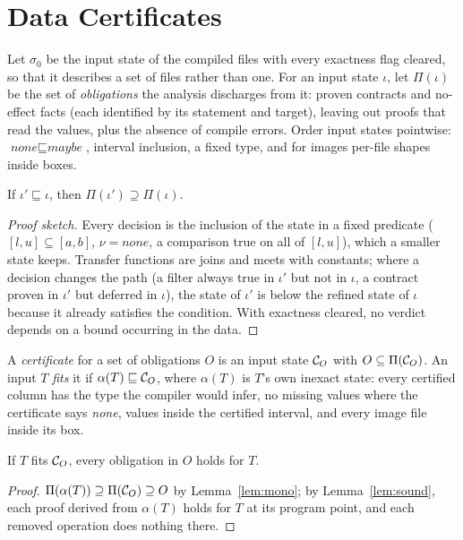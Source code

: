 \section{Data Certificates}\label{sec:cert}

Let $\sigma_0$ be the input state of the compiled files with every exactness flag cleared, so that it
describes a set of files rather than one. For an input state $\iota$, let $\Pi(\iota)$ be the set of
\emph{obligations} the analysis discharges from it: proven contracts and no-effect facts (each
identified by its statement and target), leaving out proofs that read the values, plus the absence
of compile errors. Order input states pointwise: $\textit{none} \sqsubseteq \textit{maybe}$,
interval inclusion, a fixed type, and for images per-file shapes inside boxes.

\begin{lemma}[Monotonicity]\label{lem:mono}
If $\iota' \sqsubseteq \iota$, then $\Pi(\iota') \supseteq \Pi(\iota)$.
\end{lemma}
\begin{proof}[Proof sketch]
Every decision is the inclusion of the state in a fixed predicate ($[l,u] \subseteq [a,b]$,
$\nu = \textit{none}$, a comparison true on all of $[l,u]$), which a smaller state keeps. Transfer
functions are joins and meets with constants; where a decision changes the path (a filter always
true in $\iota'$ but not in $\iota$, a contract proven in $\iota'$ but deferred in $\iota$), the
state of $\iota'$ is below the refined state of $\iota$ because it already satisfies the condition.
With exactness cleared, no verdict depends on a bound occurring in the data.
\end{proof}

A \emph{certificate} for a set of obligations $O$ is an input state $\mathcal{C}_{O}$ with
$O \subseteq \Pi(\mathcal{C}_{O})$. An input $T$ \emph{fits} it if $\alpha(T) \sqsubseteq \mathcal{C}_{O}$, where
$\alpha(T)$ is $T$'s own inexact state: every certified column has the type the compiler would infer,
no missing values where the certificate says \textit{none}, values inside the certified interval,
and every image file inside its box.

\begin{theorem}\label{thm:cert}
If $T$ fits $\mathcal{C}_{O}$, every obligation in $O$ holds for $T$.
\end{theorem}
\begin{proof}
$\Pi(\alpha(T)) \supseteq \Pi(\mathcal{C}_{O}) \supseteq O$ by Lemma~\ref{lem:mono}; by
Lemma~\ref{lem:sound}, each proof derived from $\alpha(T)$ holds for $T$ at its program point, and
each removed operation does nothing there.
\end{proof}

